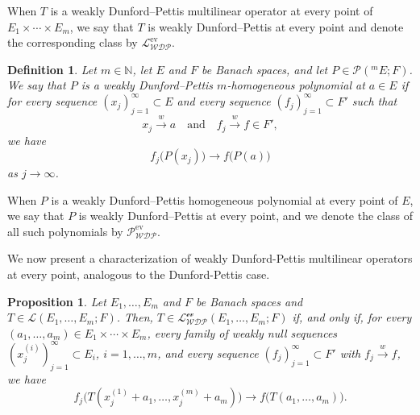 \documentclass[12 pt]{article}%
\newtheorem{proposition}[theorem]{Proposition}
\newtheorem{final remark}[theorem]{Final Remark}
\newtheorem{definition}[theorem]{Definition}
\begin{document}
When $T$ is a weakly Dunford–Pettis multilinear operator at every point of $E_1 \times \cdots \times E_m$, we say that $T$ is weakly Dunford–Pettis at every point and denote the corresponding class by $\mathcal{L_{WDP}^{\mathrm{ev}}}$.

\begin{definition}\label{WDPPH}
	Let $m \in \mathbb{N}$, let $E$ and $F$ be Banach spaces, and let $P \in \mathcal{P}(^mE;F)$. We say that $P$ is a weakly Dunford–Pettis $m$-homogeneous polynomial at $a \in E$ if for every sequence $(x_j)_{j=1}^{\infty} \subset E$ and every sequence $(f_j)_{j=1}^{\infty} \subset F'$ such that
	\[
	x_j \overset{w}{\longrightarrow} a
	\quad \text{and} \quad
	f_j \overset{w}{\longrightarrow} f \in F',
	\]
	we have
	\[
	f_j\big(P(x_j)\big) \longrightarrow f\big(P(a)\big)
	\]
	as $j \to \infty$.
\end{definition}


When $P$ is a weakly Dunford–Pettis homogeneous polynomial at every point of $E$, we say that $P$ is weakly Dunford–Pettis at every point, and we denote the class of all such polynomials by $\mathcal{P_{WDP}^{\mathrm{ev}}}$.

We now present a characterization of weakly Dunford-Pettis multilinear operators at every point, analogous to the Dunford-Pettis case.

\begin{proposition}
	Let $E_1,\dots, E_m$ and $F$ be Banach spaces and $T \in \mathcal{L}(E_1,\dots, E_m; F)$. Then, $T \in \mathcal{L_{WDP}^{\text{ev}}}(E_1,\dots, E_m; F)$ if, and only if, for every $(a_1,\dots, a_m) \in E_1\times\cdots\times E_m$, every family of weakly null sequences $(x_j^{(i)})_{j=1}^{\infty} \subset E_i$, $i=1,\dots,m$, and every sequence $(f_j)_{j=1}^{\infty} \subset F'$ with $f_j \overset{w}{\longrightarrow} f$, we have
	\begin{equation*}
		f_j\big(T(x_j^{(1)} + a_1,\dots, x_j^{(m)} + a_m)\big)
		\longrightarrow
		f\big(T(a_1,\dots, a_m)\big).
	\end{equation*}
\end{proposition}
\end{document}
